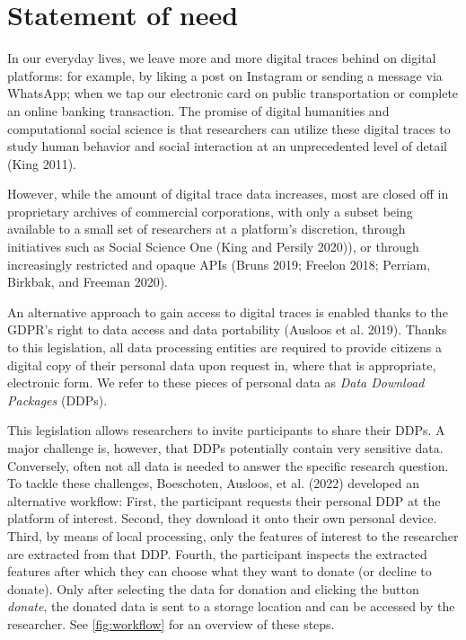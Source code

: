 \documentclass[
]{article}
\begin{document}
\hypertarget{statement-of-need}{%
\section{Statement of need}\label{statement-of-need}}

In our everyday lives, we leave more and more digital traces behind on
digital platforms: for example, by liking a post on Instagram or sending
a message via WhatsApp; when we tap our electronic card on public
transportation or complete an online banking transaction. The promise of
digital humanities and computational social science is that researchers
can utilize these digital traces to study human behavior and social
interaction at an unprecedented level of detail (King 2011).

However, while the amount of digital trace data increases, most are
closed off in proprietary archives of commercial corporations, with only
a subset being available to a small set of researchers at a platform's
discretion, through initiatives such as Social Science One (King and
Persily 2020)), or through increasingly restricted and opaque APIs
(Bruns 2019; Freelon 2018; Perriam, Birkbak, and Freeman 2020).

An alternative approach to gain access to digital traces is enabled
thanks to the GDPR's right to data access and data portability (Ausloos
et al. 2019). Thanks to this legislation, all data processing entities
are required to provide citizens a digital copy of their personal data
upon request in, where that is appropriate, electronic form. We refer to
these pieces of personal data as \emph{Data Download Packages} (DDPs).

This legislation allows researchers to invite participants to share
their DDPs. A major challenge is, however, that DDPs potentially contain
very sensitive data. Conversely, often not all data is needed to answer
the specific research question. To tackle these challenges, Boeschoten,
Ausloos, et al. (2022) developed an alternative workflow: First, the
participant requests their personal DDP at the platform of interest.
Second, they download it onto their own personal device. Third, by means
of local processing, only the features of interest to the researcher are
extracted from that DDP. Fourth, the participant inspects the extracted
features after which they can choose what they want to donate (or
decline to donate). Only after selecting the data for donation and
clicking the button \emph{donate}, the donated data is sent to a storage
location and can be accessed by the researcher. See
\autoref{fig:workflow} for an overview of these steps.
\end{document}

